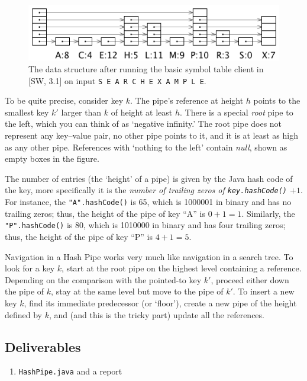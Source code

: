 \documentclass{tufte-handout}
\begin{document}
\begin{figure}
  \includegraphics[width=\textwidth]{img/full.png}
  \caption{The data structure after running the basic symbol table client in [SW, 3.1] on input {\tt S E A R C H E X A M P L E}.}
\end{figure}

To be quite precise, consider key $k$.
The pipe's reference at height $h$ points to the smallest key $k'$ larger than $k$ of height at least $h$.
There is a special \emph{root} pipe to the left, which you can think of as `negative infinity.' 
The root pipe does not represent any key--value pair, no other pipe points to it, and it is at least as high as any other pipe.
References with `nothing to the left' contain \emph{null}, shown as empty boxes in the figure.

The number of entries (the `height' of a pipe) is given by the Java hash code of the key,
more specifically it is the \emph{number of trailing zeros of {\tt key.hashCode()} $+1$}.
For instance, the {\tt "A".hashCode()} is 65, which is 1000001 in binary and has no trailing zeros; thus, the height of the pipe of key ``A'' is $0+1=1$.
Similarly, the {\tt "P".hashCode()} is 80, which is 1010000 in binary and has four trailing zeros; thus, the height of the pipe of key ``P'' is $4+1=5$.

Navigation in a Hash Pipe works very much like navigation in a search tree.
To look for a key $k$, start at the root pipe on the highest level containing a reference.
Depending on the comparison with the pointed-to key $k'$, proceed either down the pipe of $k$, stay at the same level but move to the pipe of $k'$.
To insert a new key $k$, find its immediate predecessor (or `floor'), create a new pipe of the height defined by $k$, and (and this is the tricky part) update all the references.

\subsection{Deliverables}

\begin{enumerate}
\item {\tt HashPipe.java} and a report
\end{enumerate}
\end{document}
